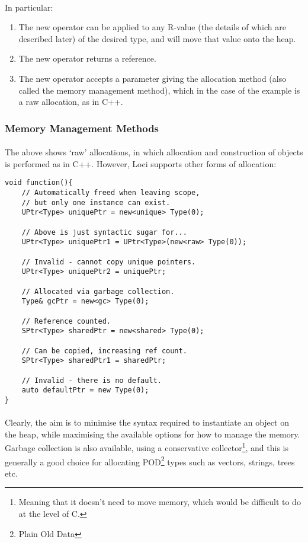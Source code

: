 \documentclass[12pt,twoside,notitlepage]{report}
\begin{document}
\paragraph{}
In particular:

\begin{enumerate}
\item The new operator can be applied to any R-value (the details of which are described later) of the desired type, and will move that value onto the heap.
\item The new operator returns a reference.
\item The new operator accepts a parameter giving the allocation method (also called the memory management method), which in the case of the example is a raw allocation, as in C++.
\end{enumerate}

\subsubsection{Memory Management Methods}

\paragraph{}
The above shows `raw' allocations, in which allocation and construction of objects is performed as in C++. However, Loci supports other forms of allocation:

\small{
\begin{verbatim}
void function(){
    // Automatically freed when leaving scope,
    // but only one instance can exist.
    UPtr<Type> uniquePtr = new<unique> Type(0);
    
    // Above is just syntactic sugar for...
    UPtr<Type> uniquePtr1 = UPtr<Type>(new<raw> Type(0));
    
    // Invalid - cannot copy unique pointers.
    UPtr<Type> uniquePtr2 = uniquePtr;
    
    // Allocated via garbage collection.
    Type& gcPtr = new<gc> Type(0);
    
    // Reference counted.
    SPtr<Type> sharedPtr = new<shared> Type(0);
    
    // Can be copied, increasing ref count.
    SPtr<Type> sharedPtr1 = sharedPtr;
    
    // Invalid - there is no default.
    auto defaultPtr = new Type(0);
}
\end{verbatim}
}

\paragraph{}
Clearly, the aim is to minimise the syntax required to instantiate an object on the heap, while maximising the available options for how to manage the memory. Garbage collection is also available, using a conservative collector\footnote{Meaning that it doesn't need to move memory, which would be difficult to do at the level of C.}, and this is generally a good choice for allocating POD\footnote{Plain Old Data} types such as vectors, strings, trees etc.
\end{document}
